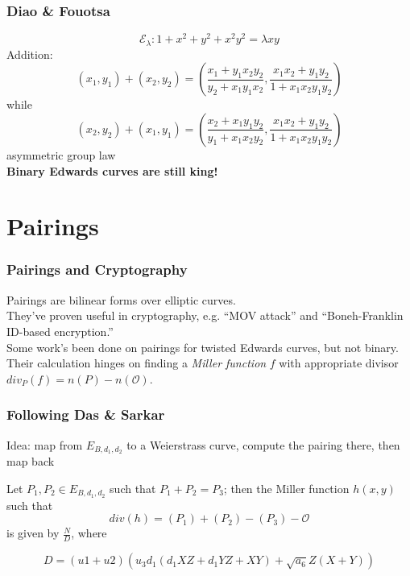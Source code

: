 \documentclass[xcolor=dvipsnames, handout]{beamer}
\begin{document}
\begin{frame}
    \frametitle{Diao \& Fouotsa}
    \begin{displaymath}
        \mathcal{E}_\lambda: 1 + x^2 + y^2 + x^2y^2 = \lambda xy
    \end{displaymath}
    \pause
    Addition:
    \begin{displaymath}
        (x_1, y_1) + (x_2, y_2) = \left(
            \frac{x_1 + y_1x_2y_2}{y_2 + x_1y_1x_2},
            \frac{x_1x_2 + y_1y_2}{1 + x_1x_2y_1y_2}
        \right)
    \end{displaymath}
    while
    \begin{displaymath}
        (x_2, y_2) + (x_1, y_1) = \left(
            \frac{x_2 + x_1y_1y_2}{y_1 + x_1x_2y_2},
            \frac{x_1x_2 + y_1y_2}{1 + x_1x_2y_1y_2}
        \right)
    \end{displaymath}
    \pause
    \alert{asymmetric group law}\\
    \pause
    \textbf{Binary Edwards curves are still king!}
\end{frame}

\section{Pairings}

\begin{frame}
    \frametitle{Pairings and Cryptography}
    Pairings are bilinear forms over elliptic curves.\\
    They've proven useful in cryptography, e.g. ``MOV attack'' and
        ``Boneh-Franklin ID-based encryption.''\\
    Some work's been done on pairings for twisted Edwards curves, but not
        binary.\\
    \pause
    \alert{Their calculation hinges on finding a \textit{Miller function} $f$
        with appropriate divisor $div_P(f) = n(P) - n(\mathcal{O})$.}
\end{frame}

\begin{frame}
    \frametitle{Following Das \& Sarkar}
    Idea: map from $E_{B, d_1, d_2}$ to a Weierstrass curve, compute the
    pairing there, then map back
    \pause
    \begin{theorem}
        Let $P_1, P_2 \in E_{B, d_1, d_2}$ such that $P_1 + P_2 = P_3$; then
        the Miller function $h(x, y)$ such that 
        \begin{displaymath}
            div(h) = (P_1) + (P_2) - (P_3) - \mathcal{O}
        \end{displaymath}
        is given by $\frac{N}{D}$, where
    \end{theorem}
    \begin{displaymath}
    D =
        (u1 + u2)
        (u_{3}  d_{1}  (d_{1} X Z + d_{1} Y Z + X Y) + \sqrt{a_6}  Z  (X + Y))
    \end{displaymath}
\end{frame}
\end{document}
